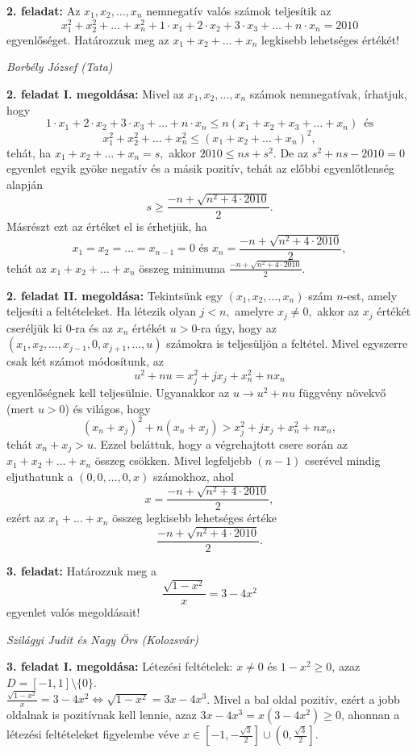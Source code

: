 \documentclass[a4paper,10pt]{article}
\def\ki#1#2{\hfill {\it #1 (#2)}\medskip}
\begin{document}
\medskip


{\bf 2. feladat: } Az $x_1,x_2,\ldots, x_n$ nemnegatív valós számok teljesítik
az $$x_1^2+x_2^2+\ldots +x_n^2 + 1\cdot x_1+2\cdot x_2+3\cdot
x_3+\ldots +n\cdot x_n=2010$$ egyenlőséget. Határozzuk meg az
$x_1+x_2+\ldots +x_n$ legkisebb lehetséges értékét!

\ki{Borbély József}{Tata}\medskip

\textbf{2. feladat I. megoldása: } Mivel az $x_1,x_2,\ldots, x_n$ számok
nemnegatívak,
ír\-hat\-juk, hogy
$$1\cdot x_1+2\cdot x_2+3\cdot
x_3+\ldots +n\cdot x_n\leq n( x_1+ x_2+ x_3+\ldots + x_n)
\,\,\,\mbox{és}$$
$$x_1^2+x_2^2+\ldots +x_n^2\leq (x_1+x_2+\ldots +x_n)^2,$$ tehát,
ha $x_1+x_2+\ldots +x_n=s,$ akkor $2010\leq ns+s^2.$ De az
$s^2+ns-2010=0$ egyenlet egyik gyöke negatív és a másik
pozitív, tehát az előbbi egyenlőtlenség alapján
$$s\geq \frac{-n+\sqrt{n^2+4\cdot 2010}}{2}.$$ Másrészt ezt az
értéket el is érhetjük, ha $$x_1=x_2=\ldots =x_{n-1}=0
\mbox{ és } x_n=\frac{-n+\sqrt{n^2+4\cdot 2010}}{2},$$ tehát az
$x_1+x_2+\ldots +x_n$ összeg minimuma $\frac{-n+\sqrt{n^2+4\cdot
2010}}{2}.$

\medskip
 
\textbf{2. feladat II. megoldása: }  Tekintsünk egy $(x_1,x_2,\ldots,
x_n)$ szám $n$-est, amely teljesíti a feltételeket. Ha
létezik olyan $j<n,$ amelyre $x_j\neq 0,$ akkor az $x_j$
értékét cseréljük  ki $0$-ra és az $x_n$ értékét
$u>0$-ra úgy, hogy az $(x_1,x_2,\ldots,x_{j-1},0,x_{j+1},\ldots,
u)$ számokra is teljesüljön a feltétel. Mivel egyszerre csak
két számot módosítunk, az $$u^2+nu=x_j^2+jx_j+x_n^2+nx_n$$
egyenlőségnek kell teljesülnie. Ugyanakkor az $u\to u^2+nu$
függ\-vény növekvő (mert $u>0$) és világos, hogy
$$(x_n+x_j)^2+n(x_n+x_j)>x_j^2+jx_j+x_n^2+nx_n,$$ tehát
$x_n+x_j>u.$ Ezzel beláttuk, hogy a végrehajtott csere során
az $x_1+x_2+\ldots + x_n$ összeg csökken. Mivel legfeljebb
$(n-1)$ cserével mindig eljuthatunk a $(0,0,\ldots, 0,x)$
számokhoz, ahol $$x=\frac{-n+\sqrt{n^2+4\cdot 2010}}{2},$$ ezért
az $x_1+\ldots +x_n$ összeg legkisebb lehetséges értéke
$$\frac{-n+\sqrt{n^2+4\cdot 2010}}{2}.$$

\medskip

{\bf 3. feladat: } Határozzuk meg a
$$\frac{\sqrt{1-x^2}}{x}=3-4x^2$$ egyenlet valós megoldásait!

\ki{Szilágyi Judit és Nagy Örs}{Kolozsvár}\medskip

\textbf{3. feladat I. megoldása: } Létezési feltételek: $x\neq0$ és $1-x^2\geq0$, azaz $D=[-1,1]\setminus\{0\}$.\\
$\frac{\sqrt{1-x^2}}{x}=3-4x^2 \Longleftrightarrow
\sqrt{1-x^2}=3x-4x^3$. Mivel a bal oldal po\-zitív, ezért a jobb
oldalnak is po\-zitívnak kell lennie, azaz $3x-4x^3=x(3-4x^2)\geq0$,
ahonnan a létezési feltételeket figyelembe véve $x\in\left[-1,
-\frac{\sqrt{3}}{2}\right]\cup\left(0,\frac{\sqrt{3}}{2}\right]$.
\end{document}
